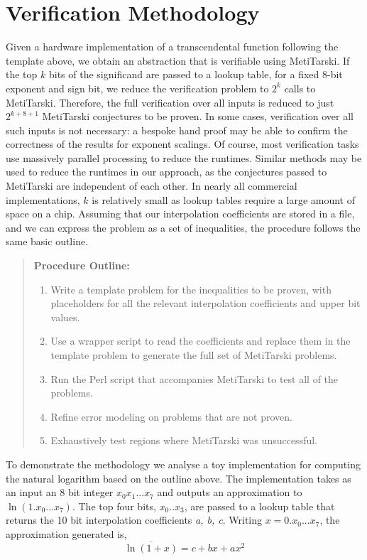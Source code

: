 \documentclass[smallcondensed]{svjour3}
\begin{document}
\section{Verification Methodology}
\label{Method}
Given a hardware implementation of a transcendental function following the template above, we obtain an abstraction that is verifiable using MetiTarski. If the top $k$ bits of the significand are passed to a lookup table, for a fixed 8-bit exponent and sign bit, we reduce the verification problem to $2^k$ calls to MetiTarski. Therefore, the  full verification over all inputs is reduced to 
just $2^{k+8+1}$ MetiTarski conjectures to be proven. In some cases, verification over all such inputs is not necessary: a bespoke hand proof may be able to confirm the correctness of the results for exponent scalings. Of course, most verification tasks use massively parallel processing to reduce the runtimes. Similar methods may be used to reduce the runtimes in our approach, as the conjectures passed to MetiTarski are independent of each other. In nearly all commercial implementations, $k$ is relatively small as lookup tables require a large amount of space on a chip. Assuming that our interpolation coefficients are stored in a file, and we can express the problem as a set of inequalities, the procedure follows the same basic outline.


\begin{quotation}
\textbf{Procedure Outline:}
\begin{enumerate}
\item Write a template problem for the inequalities to be proven, with placeholders for all the relevant interpolation coefficients and upper bit values.
\item Use a wrapper script to read the coefficients and replace them in the template problem to generate the full set of MetiTarski problems.
\item Run the Perl script that accompanies MetiTarski to test all of the problems.
\item Refine error modeling on problems that are not proven.
\item Exhaustively test regions where MetiTarski was unsuccessful.
\end{enumerate}  
\end{quotation}

To demonstrate the methodology we analyse a toy implementation for computing the natural logarithm based on the outline above. The implementation takes as an input an 8 bit integer $x_0x_1...x_7$ and outputs an approximation to $\ln(1.x_0...x_7)$. The top four bits, $x_0..x_3$, are passed to a lookup table that returns the 10 bit interpolation coefficients \textit{a, b, c}. Writing $x=0.x_0...x_7$, the approximation generated is,
$$ \overline{\ln(1+x)}=c + bx +ax^2 $$
\end{document}
